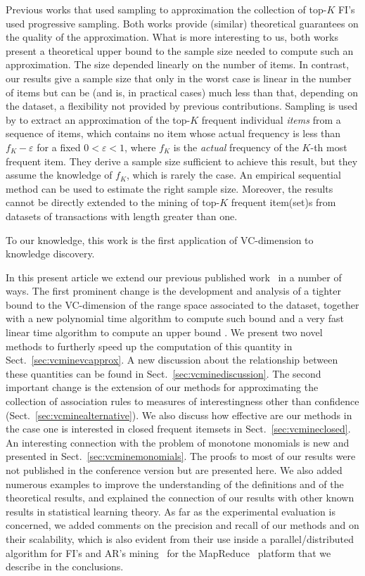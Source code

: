 Previous works that used sampling to approximation the collection of top-$K$
FI's~\citep{SchefferW02,PietracaprinaRUV10} used progressive sampling. Both
works provide (similar) theoretical guarantees on the quality of the
approximation. What is more interesting to us, both works present a theoretical
upper bound to the sample size needed to compute such an approximation. The size
depended linearly on the number of items. 
In contrast, our results give a sample size that only in the worst case is
linear in the number of items but can be (and is, in practical cases) much less
than that, depending on the dataset, a flexibility not provided by previous
contributions. 
Sampling is used by \citet{VasudevanV09} to extract
an approximation of the top-$K$ frequent individual \emph{items} from a sequence
of items, which contains no item whose actual frequency is less than
$f_K-\varepsilon$ for a fixed $0<\varepsilon<1$, where $f_K$ is the
\emph{actual} frequency of the $K$-th most frequent item. They derive a sample
size sufficient to achieve this result, but they assume the knowledge of $f_K$,
which is rarely the case. An empirical sequential method can be used to estimate
the right sample size. Moreover, the results cannot be directly extended to the
mining of top-$K$ frequent item(set)s from datasets of transactions with length
greater than one.

 To our knowledge, this work is the
first application of VC-dimension to knowledge discovery.

In this present article we extend our previous published work~\citep{RiondatoU12}
in a number of ways. The first prominent change is the development and analysis
of a tighter bound to the VC-dimension of the range space associated to the
dataset, together with a new polynomial time algorithm to compute such bound and
a very fast linear time algorithm to compute an upper bound
. We present two novel methods to furtherly speed up the computation of this
quantity in Sect.~\ref{sec:vcminevcapprox}. A new discussion about
the relationship between these quantities can be found in
Sect.~\ref{sec:vcminediscussion}. The second important change is the extension of our
methods for approximating the collection of association rules to measures of
interestingness other than confidence (Sect.~\ref{sec:vcminealternative}). We also
discuss how effective are our methods in the case one is interested in closed
frequent itemsets in Sect.~\ref{sec:vcmineclosed}. An interesting connection with the
problem of monotone monomials is new and presented in Sect.~\ref{sec:vcminemonomials}.
The proofs to most of our results were not published in the conference version
but are presented here. We also added numerous examples to improve the
understanding of the definitions and of the theoretical results, and explained
the connection of our results with other known results in statistical learning
theory. As far as the experimental evaluation is concerned, we added comments on
the precision and recall of our methods and on their scalability, which is also
evident from their use inside a parallel/distributed algorithm for FI's and AR's
mining~\citep{RiondatoDFU12} for the MapReduce~\citep{DeanS04} platform that we
describe in the conclusions.

